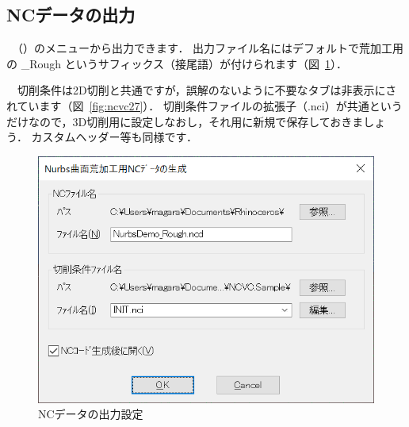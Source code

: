 \subsection{NCデータの出力}
　（）のメニューから出力できます．
出力ファイル名にはデフォルトで荒加工用の \_Rough というサフィックス（接尾語）が付けられます（図~\ref{fig:ncvc26}）．

　切削条件は2D切削と共通ですが，誤解のないように不要なタブは非表示にされています（図~\ref{fig:ncvc27}）．
切削条件ファイルの拡張子（.nci）が共通というだけなので，3D切削用に設定しなおし，それ用に新規で保存しておきましょう．
カスタムヘッダー等も同様です．

\begin{minipage}{0.5\textwidth}
\begin{figure}[H]
\centering
\includegraphics[scale=0.7]{No2/fig/fig26.png}
\caption{NCデータの出力設定}
\label{fig:ncvc26}
\end{figure}
\end{minipage}

